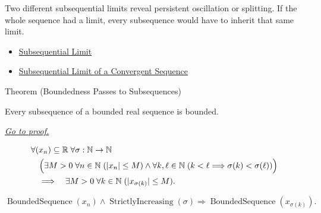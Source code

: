 \begin{remark*}[Interpretation]
Two different subsequential limits reveal persistent oscillation or splitting.
If the whole sequence had a limit, every subsequence would have to inherit
that same limit.
\end{remark*}

\begin{dependencies}
\begin{itemize}
  \item \hyperref[def:subsequential-limit]{Subsequential Limit}
  \item \hyperref[thm:subsequential-limit-of-convergent-sequence]{Subsequential Limit of a Convergent Sequence}
\end{itemize}
\end{dependencies}


\begin{theorembox}{Theorem (Boundedness Passes to Subsequences)}
\begin{theorem}
\label{thm:boundedness-passes-to-subsequences}
Every subsequence of a bounded real sequence is bounded.

\smallskip
\noindent
\hyperref[prf:boundedness-passes-to-subsequences]{\textit{Go to proof.}}
\end{theorem}
\end{theorembox}

\begin{remark*}
\[
\begin{aligned}
&\forall (x_n)\subseteq\mathbb{R}\;\forall \sigma:\mathbb{N}\to\mathbb{N}\\
&\quad\Bigl(
  \exists M>0\;\forall n\in\mathbb{N}\;(|x_n|\le M)
  \land
  \forall k,\ell\in\mathbb{N}\;(k<\ell\Longrightarrow\sigma(k)<\sigma(\ell))
\Bigr)\\
&\quad\Longrightarrow\quad
\exists M>0\;\forall k\in\mathbb{N}\;(|x_{\sigma(k)}|\le M).
\end{aligned}
\]
\end{remark*}

\begin{remark*}
\[
\operatorname{BoundedSequence}(x_n)
\land
\operatorname{StrictlyIncreasing}(\sigma)
\Longrightarrow
\operatorname{BoundedSequence}(x_{\sigma(k)}).
\]
\end{remark*}

